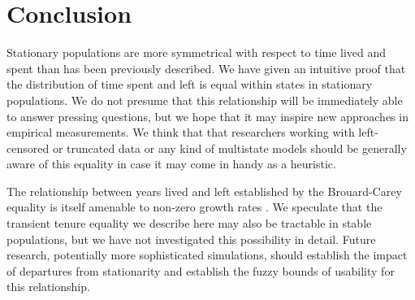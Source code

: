 \documentclass[12pt,oneside,a4paper]{article}
\theoremstyle{definition}
\begin{document}
\section{Conclusion}
Stationary populations are more symmetrical with respect to time lived and
spent than has been previously described. We have given an intuitive proof that
the distribution of time spent and left is equal within states in
stationary populations. We do not presume that this relationship will be immediately able to answer pressing questions, but we
hope that it may inspire new approaches in empirical measurements. We think
that that researchers working with left-censored or truncated data or
any kind of multistate models should be generally aware of this equality in case
it may come in handy as a heuristic.

The relationship between years lived
and left established by the Brouard-Carey equality is itself amenable to non-zero growth rates \citep{riffe2015renewal}.
We speculate that the transient tenure equality we describe here may also be tractable in stable
populations, but we have not investigated this possibility in detail. Future
research, potentially more sophisticated simulations, should establish the
impact of departures from stationarity and establish the fuzzy bounds of
usability for this relationship.



%

  
\end{document}
